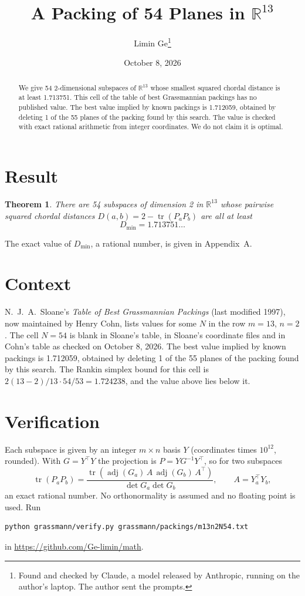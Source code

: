 \documentclass[11pt,a4paper]{article}
\title{A Packing of 54 Planes in $\mathbb{R}^{13}$}
\author{Limin Ge\thanks{Found and checked by Claude, a model released by Anthropic, running on the author's laptop. The author sent the prompts.}}
\date{October 8, 2026}
\newtheorem*{theorem}{Theorem}
\begin{document}
\maketitle
\begin{abstract}
We give 54 2-dimensional subspaces of $\mathbb{R}^{13}$ whose smallest squared chordal distance is at least 1.713751. This cell of the table of best Grassmannian packings has no published value. The best value implied by known packings is 1.712059, obtained by deleting 1 of the 55 planes of the packing found by this search. The value is checked with exact rational arithmetic from integer coordinates. We do not claim it is optimal.
\end{abstract}

\section{Result}
\begin{theorem}
There are 54 subspaces of dimension 2 in $\mathbb{R}^{13}$ whose pairwise squared chordal distances $D(a,b) = 2 - \operatorname{tr}(P_aP_b)$ are all at least
\[ D_{\min} = 1.713751\ldots \]
\end{theorem}
The exact value of $D_{\min}$, a rational number, is given in Appendix~A.


\section{Context}
N.~J.~A.~Sloane's \emph{Table of Best Grassmannian Packings} (last modified 1997), now maintained by Henry Cohn, lists values for some $N$ in the row $m=13$, $n=2$. The cell $N=54$ is blank in Sloane's table, in Sloane's coordinate files and in Cohn's table as checked on October 8, 2026. The best value implied by known packings is 1.712059, obtained by deleting 1 of the 55 planes of the packing found by this search. The Rankin simplex bound for this cell is $2(13-2)/13\cdot 54/53 = 1.724238$, and the value above lies below it.


\section{Verification}
Each subspace is given by an integer $m\times n$ basis $Y$ (coordinates times $10^{12}$, rounded). With $G=Y^\top Y$ the projection is $P=YG^{-1}Y^\top$, so for two subspaces
\[ \operatorname{tr}(P_aP_b)=\frac{\operatorname{tr}(\operatorname{adj}(G_a)\,A\,\operatorname{adj}(G_b)\,A^\top)}{\det G_a\det G_b},\qquad A=Y_a^\top Y_b, \]
an exact rational number. No orthonormality is assumed and no floating point is used. Run
\begin{verbatim}
python grassmann/verify.py grassmann/packings/m13n2N54.txt
\end{verbatim}
in \url{https://github.com/Ge-limin/math}.
\end{document}
